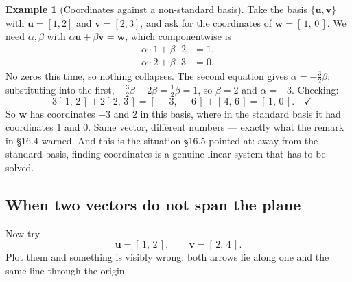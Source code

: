 \documentclass[11pt]{article}
\theoremstyle{definition}
\newtheorem{ex}{Example}[section]
\theoremstyle{remark}
\newcommand{\vc}[1]{\mathbf{#1}}
\newcommand{\lattice}[4]{%
  \draw[step=1cm,gray!25,very thin] (#1,#3) grid (#2,#4);
  \draw[axisline] (#1,0) -- (#2+0.45,0) node[right,font=\scriptsize,black]{$x$};
  \draw[axisline] (0,#3) -- (0,#4+0.45) node[above,font=\scriptsize,black]{$y$};
}
\begin{document}
\begin{ex}[Coordinates against a non-standard basis]
Take the basis $\{\vc{u},\vc{v}\}$ with $\vc{u}=[1,2]$ and $\vc{v}=[2,3]$, and
ask for the coordinates of $\vc{w}=[\,1,\,0\,]$. We need $\alpha,\beta$ with
$\alpha\vc{u}+\beta\vc{v}=\vc{w}$, which componentwise is
\[
  \begin{aligned}
    \alpha\cdot 1 + \beta\cdot 2 &= 1, \\
    \alpha\cdot 2 + \beta\cdot 3 &= 0 .
  \end{aligned}
\]
No zeros this time, so nothing collapses. The second equation gives
$\alpha=-\tfrac32\beta$; substituting into the first,
$-\tfrac32\beta+2\beta=\tfrac12\beta=1$, so $\beta=2$ and $\alpha=-3$. Checking:
\[
  -3[\,1,\,2\,] + 2[\,2,\,3\,] = [\,-3,\,-6\,]+[\,4,\,6\,] = [\,1,\,0\,] .
  \quad\checkmark
\]
So $\vc{w}$ has coordinates $-3$ and $2$ in this basis, where in the standard
basis it had coordinates $1$ and $0$. Same vector, different numbers --- exactly
what the remark in \S16.4 warned. And this is the situation \S16.5 pointed at:
away from the standard basis, finding coordinates is a genuine linear system
that has to be solved.
\end{ex}

\subsection{When two vectors do not span the plane}
Now try
\[
  \vc{u}=[\,1,\,2\,],
  \qquad
  \vc{v}=[\,2,\,4\,] .
\]
Plot them and something is visibly wrong: both arrows lie along one and the same
line through the origin.

\begin{center}
\end{center}
\end{document}
